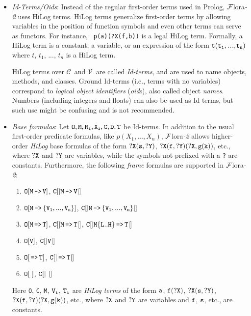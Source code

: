 \documentclass[11pt]{article}
\newcommand{\FLORA}{{\mbox{\sc ${\cal F}${lora}\rm\emph{-2}}}\xspace}
\newcommand{\FLSYSTEM}{\FLORA}
\newcommand{\mvd}{{\mbox{\tt \,->\,}}}  %
\newcommand{\Mvd}{{\mbox{\tt \,=>\,}}}  %
\newcommand{\fl}{\mbox{F-logic}\xspace}
\newcommand{\consts}{\ensuremath{\mathcal{C}}\xspace}
\newcommand{\vars}{\ensuremath{\mathcal{V}}\xspace}
\begin{document}
\begin{itemize}
\item \emph{Id-Terms/Oids}:
  Instead of the regular first-order terms used in Prolog, \FLSYSTEM
  uses HiLog terms. HiLog terms \cite{hilog-jlp} generalize first-order
  terms by allowing variables in the position of function symbols
  and even other terms can serve as functors. For instance, {\tt
  p(a)(?X(f,b))} is a legal HiLog term. Formally, a HiLog term is a
  constant, a variable, or an expression of the form $\tt t(t_1,...,t_n)$ 
  where $t$, $t_1$, ..., $t_n$ is a HiLog term.

    HiLog terms over \consts\ and \vars\ are called \emph{Id-terms},
    and are used to name objects, methods, and classes.  Ground Id-terms
    (i.e., terms with no variables) correspond to \emph{logical
      object identifiers} (\emph{oid}s), also called object \emph{names}.
    Numbers (including integers and floats) can also be used as Id-terms,
    but such use might be confusing and is not recommended.
  \index{base formula!in \fl}
\item \emph{Base formulas}: Let $\tt O,M,R_{i},X_{i},C,D,T$ be Id-terms.  In
  addition to the usual first-order predicate formulas, like
  $p(X_1,\dots,X_n)$, \FLSYSTEM allows higher-order \emph{HiLog} base
  formulas of the form $\tt ?X(s,?Y)$, $\tt ?X(f,?Y)(?X,g(k))$, etc., where $\tt ?X$
  and $\tt ?Y$ are variables, while the symbols not prefixed with a \texttt{?}
  are constants.  Furthermore,
  the following \emph{frame} formulas are supported in
  \FLSYSTEM:
  \medskip

  \begin{enumerate}
    \item \label{eq-value-atom} $\tt O[M\mvd V]$, $\tt C[|M\mvd V|]$
    \item $\tt O[M\mvd \{V_1,...,V_n\}]$, $\tt C[|M\mvd \{V_1,...,V_n\}|]$
    \item $\tt O[M\Mvd T]$, $\tt C[|M\Mvd T|]$, $\tt C[|M\{L..H\}\Mvd T|]$
    \item $\tt O[V]$, $\tt C[|V|]$
    \item $\tt O[\Mvd T]$, $\tt C[|\Mvd T|]$
    \item $\tt O[~]$, $\tt C[|~|]$
  \end{enumerate}
  
  Here {\tt O}, {\tt C}, {\tt M}, ${\tt V_i}$,
  ${\tt T_i}$ are \emph{HiLog terms} of the form $\tt a$,
  $\tt f(?X)$, $\tt ?X(s,?Y)$, $\tt ?X(f,?Y)(?X,g(k))$, etc., where $\tt ?X$
  and $\tt ?Y$ are variables and $\tt f$, $\tt s$, etc., are
  constants.
  

\end{itemize}
\end{document}
